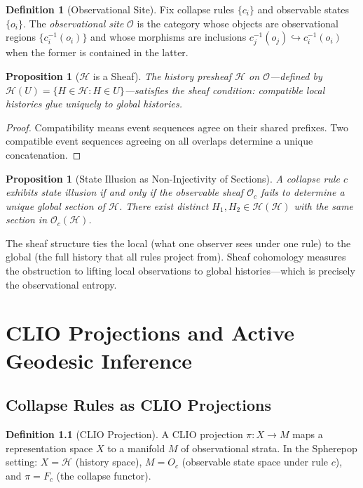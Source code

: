 \documentclass[12pt, a4paper, openany]{book}
\theoremstyle{plain}
\newtheorem{proposition}[theorem]{Proposition}
\theoremstyle{definition}
\newtheorem{definition}[theorem]{Definition}
\theoremstyle{remark}
\newcommand{\calH}{\mathcal{H}}
\begin{document}
\begin{definition}[Observational Site]
Fix collapse rules $\{c_i\}$ and observable states $\{o_i\}$. The
\emph{observational site} $\mathcal{O}$ is the category whose objects are
observational regions $\{c_i^{-1}(o_i)\}$ and whose morphisms are inclusions
$c_j^{-1}(o_j) \hookrightarrow c_i^{-1}(o_i)$ when the former is contained in
the latter.
\end{definition}

\begin{proposition}[$\calH$ is a Sheaf]
The history presheaf $\calH$ on $\mathcal{O}$---defined by $\calH(U) = \{H \in \calH : H \in U\}$---satisfies the sheaf condition: compatible local histories glue
uniquely to global histories.
\end{proposition}

\begin{proof}
Compatibility means event sequences agree on their shared prefixes. Two compatible
event sequences agreeing on all overlaps determine a unique concatenation.
\end{proof}

\begin{proposition}[State Illusion as Non-Injectivity of Sections]
A collapse rule $c$ exhibits state illusion if and only if the observable sheaf
$\mathcal{O}_c$ fails to determine a unique global section of $\calH$. There
exist distinct $H_1, H_2 \in \calH(\calH)$ with the same section in
$\mathcal{O}_c(\calH)$.
\end{proposition}

The sheaf structure ties the local (what one observer sees under one rule) to the
global (the full history that all rules project from). Sheaf cohomology measures
the obstruction to lifting local observations to global histories---which is
precisely the observational entropy.

\chapter{CLIO Projections and Active Geodesic Inference}

\section{Collapse Rules as CLIO Projections}

\begin{definition}[CLIO Projection]
A CLIO projection $\pi : X \to M$ maps a representation space $X$ to a manifold
$M$ of observational strata. In the Spherepop setting: $X = \calH$ (history
space), $M = O_c$ (observable state space under rule $c$), and $\pi = F_c$
(the collapse functor).
\end{definition}
\end{document}
